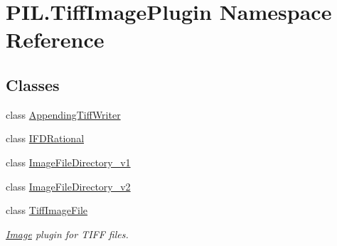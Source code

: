 \hypertarget{namespacePIL_1_1TiffImagePlugin}{}\section{P\+I\+L.\+Tiff\+Image\+Plugin Namespace Reference}
\label{namespacePIL_1_1TiffImagePlugin}
\subsection*{Classes}
\begin{DoxyCompactItemize}
\item 
class \hyperlink{classPIL_1_1TiffImagePlugin_1_1AppendingTiffWriter}{Appending\+Tiff\+Writer}
\item 
class \hyperlink{classPIL_1_1TiffImagePlugin_1_1IFDRational}{I\+F\+D\+Rational}
\item 
class \hyperlink{classPIL_1_1TiffImagePlugin_1_1ImageFileDirectory__v1}{Image\+File\+Directory\+\_\+v1}
\item 
class \hyperlink{classPIL_1_1TiffImagePlugin_1_1ImageFileDirectory__v2}{Image\+File\+Directory\+\_\+v2}
\item 
class \hyperlink{classPIL_1_1TiffImagePlugin_1_1TiffImageFile}{Tiff\+Image\+File}
\begin{DoxyCompactList}\small\item\em \hyperlink{namespacePIL_1_1Image}{Image} plugin for T\+I\+FF files. \end{DoxyCompactList}\end{DoxyCompactItemize}
